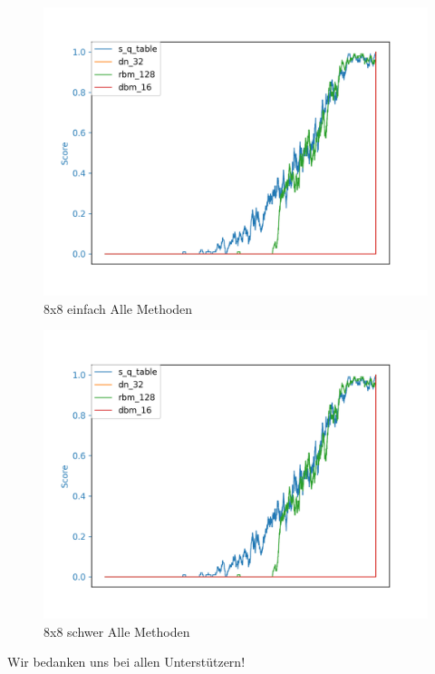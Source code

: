 \begin{figure}[H]
\centering
\includegraphics[width=\textwidth]{Figures/all_8x8_s_q_table_dn_32_rbm_128_dbm_16.png}
\caption{8x8 einfach Alle Methoden}
\label{all_7}
\end{figure}

\begin{figure}[H]
\centering
\includegraphics[width=\textwidth]{Figures/all_8x8_s_q_table_dn_32_rbm_128_dbm_16.png}
\caption{8x8 schwer Alle Methoden}
\label{all_8}
\end{figure}

\newpage

\begin{acknowledgement}
Wir bedanken uns bei allen Unterstützern!
\end{acknowledgement}
